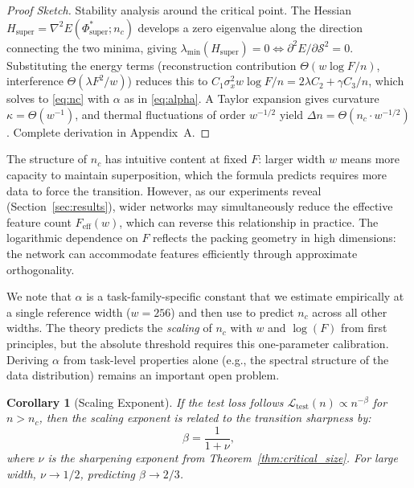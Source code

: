\documentclass{article}
\newtheorem{corollary}[theorem]{Corollary}
\newcommand{\nc}{n_c}
\newcommand{\loss}{\mathcal{L}}
\newcommand{\supidx}{\mathcal{S}}
\newcommand{\Fnum}{F}
\begin{document}
\begin{proof}[Proof Sketch]
Stability analysis around the critical point. The Hessian $H_{\text{super}} = \nabla^2 E(\Phi^*_{\text{super}}; \nc)$ develops a zero eigenvalue along the direction connecting the two minima, giving $\lambda_{\min}(H_{\text{super}}) = 0 \Leftrightarrow \partial^2 E/\partial \supidx^2 = 0$. Substituting the energy terms (reconstruction contribution $\Theta(w \log \Fnum / n)$, interference $\Theta(\lambda \Fnum^2 / w)$) reduces this to $C_1 \sigma_x^2 w \log \Fnum / n = 2\lambda C_2 + \gamma C_3 / n$, which solves to \eqref{eq:nc} with $\alpha$ as in \eqref{eq:alpha}. A Taylor expansion gives curvature $\kappa = \Theta(w^{-1})$, and thermal fluctuations of order $w^{-1/2}$ yield $\Delta n = \Theta(\nc \cdot w^{-1/2})$. Complete derivation in Appendix~A.
\end{proof}

The structure of $\nc$ has intuitive content at fixed $\Fnum$: larger width $w$ means more capacity to maintain superposition, which the formula predicts requires more data to force the transition.
However, as our experiments reveal (Section~\ref{sec:results}), wider networks may simultaneously reduce the effective feature count $F_{\text{eff}}(w)$, which can reverse this relationship in practice.
The logarithmic dependence on $\Fnum$ reflects the packing geometry in high dimensions: the network can accommodate features efficiently through approximate orthogonality.

We note that $\alpha$ is a task-family-specific constant that we estimate empirically at a single reference width ($w = 256$) and then use to predict $\nc$ across all other widths. The theory predicts the \emph{scaling} of $\nc$ with $w$ and $\log(\Fnum)$ from first principles, but the absolute threshold requires this one-parameter calibration. Deriving $\alpha$ from task-level properties alone (e.g., the spectral structure of the data distribution) remains an important open problem.

\begin{corollary}[Scaling Exponent]
\label{cor:scaling}
If the test loss follows $\loss_{\text{test}}(n) \propto n^{-\beta}$ for $n > \nc$, then the scaling exponent is related to the transition sharpness by:
\begin{equation}
\label{eq:beta}
\beta = \frac{1}{1 + \nu},
\end{equation}
where $\nu$ is the sharpening exponent from Theorem~\ref{thm:critical_size}.
For large width, $\nu \to 1/2$, predicting $\beta \to 2/3$.
\end{corollary}
\end{document}
